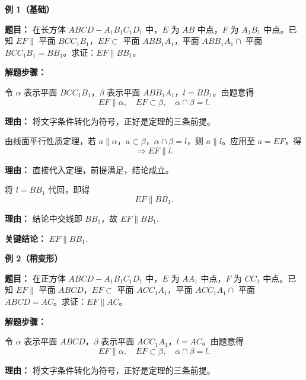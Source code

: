 \begin{examplebox}
	\textbf{\textcolor{CExample}{例 1（基础）}}

	\textbf{\textcolor{CExample}{题目：}}
	在长方体 $ABCD-A_1B_1C_1D_1$ 中，$E$ 为 $AB$ 中点，$F$ 为 $A_1B_1$ 中点。已知 $EF\parallel$ 平面 $BCC_1B_1$，$EF\subset$ 平面 $ABB_1A_1$，平面 $ABB_1A_1\cap$ 平面 $BCC_1B_1=BB_1$。求证：$EF\parallel BB_1$。

	\textbf{\textcolor{CExample}{解题步骤：}}
	\begin{description}[style=nextline, leftmargin=2.8em, labelsep=0.5em, itemsep=0.45em]
		\item[\textbf{第一步（条件符号化）：}] 令 $\alpha$ 表示平面 $BCC_1B_1$，$\beta$ 表示平面 $ABB_1A_1$，$l=BB_1$。由题意得
			\[
				EF\parallel\alpha,\quad EF\subset\beta,\quad \alpha\cap\beta=l.
			\]
			\par\textbf{理由：}
			将文字条件转化为符号，正好是定理的三条前提。

		\item[\textbf{第二步（套用定理）：}] 由线面平行性质定理，若 $a\parallel\alpha$，$a\subset\beta$，$\alpha\cap\beta=l$，则 $a\parallel l$。应用至 $a=EF$，得
			\[
				\Rightarrow EF\parallel l.
			\]
			\par\textbf{理由：}
			直接代入定理，前提满足，结论成立。

		\item[\textbf{第三步（回代结论）：}] 将 $l=BB_1$ 代回，即得
			\[
				EF\parallel BB_1.
			\]
			\par\textbf{理由：}
			结论中交线即 $BB_1$，故 $EF\parallel BB_1$.
	\end{description}

	\textbf{\textcolor{CExample}{关键结论：}}
	\textbf{$EF\parallel BB_1$}.

	\medskip
	\textbf{\textcolor{CExample}{例 2（稍变形）}}

	\textbf{\textcolor{CExample}{题目：}}
	在正方体 $ABCD-A_1B_1C_1D_1$ 中，$E$ 为 $AA_1$ 中点，$F$ 为 $CC_1$ 中点。已知 $EF\parallel$ 平面 $ABCD$，$EF\subset$ 平面 $ACC_1A_1$，平面 $ACC_1A_1\cap$ 平面 $ABCD=AC$。求证：$EF\parallel AC$。

	\textbf{\textcolor{CExample}{解题步骤：}}
	\begin{description}[style=nextline, leftmargin=2.8em, labelsep=0.5em, itemsep=0.45em]
		\item[\textbf{第一步（条件符号化）：}] 令 $\alpha$ 表示平面 $ABCD$，$\beta$ 表示平面 $ACC_1A_1$，$l=AC$。由题意得
			\[
				EF\parallel\alpha,\quad EF\subset\beta,\quad \alpha\cap\beta=l.
			\]
			\par\textbf{理由：}
			将文字条件转化为符号，正好是定理的三条前提。


\end{description}
\end{examplebox}
